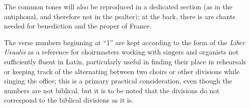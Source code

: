 \begin{enpars}
The common tones will also be reproduced in a dedicated section (as in the antiphonal, and therefore not in the psalter); at the back, there is are chants needed for benediction and the proper of France.

The verse numbers beginning at ``1'' are kept according to the form of the \textit{Liber Usualis} as a reference for choirmasters working with singers and organists not sufficiently fluent in Latin, particularly useful in finding their place in rehearsals or keeping track of the alternating between two choirs or other divisions while singing the office; this is a primary practical consideration, even though the numbers are not biblical, but it is to be noted that the divisions do not correspond to the biblical divisions as it is.
\end{enpars}
